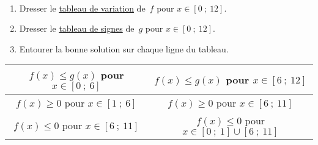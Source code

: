 \exercice~\\
\noindent 
\begin{minipage}{0.22\textwidth}
	
\end{minipage}
\hfill
\begin{minipage}{0.23\textwidth}
\begin{enumerate}
	\item Dresser le \underline{tableau de variation} de~$f$ pour \mbox{$x \in [0~;~12]$}.\\
	\item Dresser le \underline{tableau de signes} de~$g$ pour \mbox{$x \in [0~;~12]$}.\\
	\item Entourer la bonne solution sur chaque ligne du tableau.
\end{enumerate}
\end{minipage}
\vspace*{2em}
\begin{center}
\begin{tabular}{|c|c|}
\hline 
\rule[-1ex]{0pt}{2.5ex} $f(x) \leqslant g(x)$ pour $x \in [0~;~6]$ & $f(x) \leqslant g(x)$ pour $x \in [6~;~12]$ \\ 
\hline 
\rule[-1ex]{0pt}{2.5ex} $f(x) \geqslant 0$ pour $x \in [1~;~6]$ & $f(x) \geqslant 0$ pour $x \in [6~;~11]$ \\ 
\hline 
\rule[-1ex]{0pt}{2.5ex} $f(x) \leqslant 0$ pour $x \in [6~;~11]$ & $f(x) \leqslant 0$ pour $x \in [0~;~1] \cup [6~;~11]$ \\ 
\hline 
\end{tabular} 
\end{center}